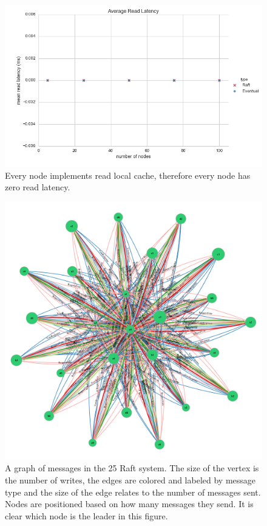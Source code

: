 \documentclass[11pt,letterpaper]{article}
\begin{document}
\begin{figure}[!h]
    \centering
        \includegraphics[width=\textwidth]{figures/read_latency.png}
        \caption{\textsf{Every node implements read local cache, therefore every node has zero read latency.}}
        \label{fig:read_latency}
\end{figure}

\begin{figure}[!h]
    \centering
        \includegraphics[width=\textwidth]{figures/raft-25users.png}
        \caption{\textsf{A graph of messages in the 25 Raft system. The size of the vertex is the number of writes, the edges are colored and labeled by message type and the size of the edge relates to the number of messages sent. Nodes are positioned based on how many messages they send. It is clear which node is the leader in this figure.}}
        \label{fig:topology}
\end{figure}
\end{document}
